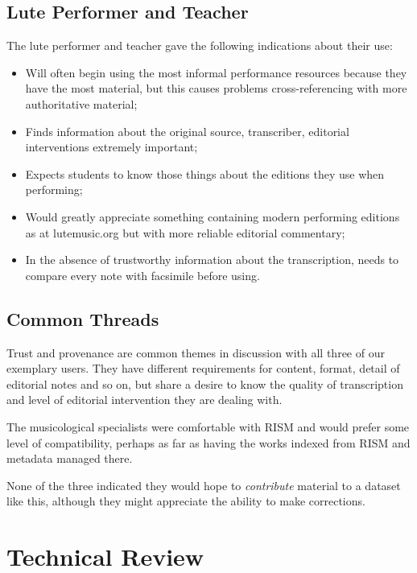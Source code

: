 \documentclass[9pt,twocolumn]{extarticle}
\begin{document}
\begin{sloppypar}
  \subsection{Lute Performer and Teacher}

  The lute performer and teacher gave the following indications about
  their use:

  \begin{itemize}
    \item Will often begin using the most informal performance
      resources because they have the most material, but this causes
      problems cross-referencing with more authoritative material;
    \item Finds information about the original source, transcriber,
      editorial interventions extremely important;
    \item Expects students to know those things about the editions
      they use when performing;
    \item Would greatly appreciate something containing modern
      performing editions as at lutemusic.org but with more reliable
      editorial commentary;
    \item In the absence of trustworthy information about the
      transcription, needs to compare every note with facsimile before
      using.
  \end{itemize}

  \subsection{Common Threads}

  Trust and provenance are common themes in discussion with all three
  of our exemplary users. They have different requirements for
  content, format, detail of editorial notes and so on, but share a
  desire to know the quality of transcription and level of editorial
  intervention they are dealing with.

  The musicological specialists were comfortable with RISM and would
  prefer some level of compatibility, perhaps as far as having the
  works indexed from RISM and metadata managed there.

  None of the three indicated they would hope to {\em contribute}
  material to a dataset like this, although they might appreciate the
  ability to make corrections.
  
  \section{Technical Review}


\end{sloppypar}
\end{document}
